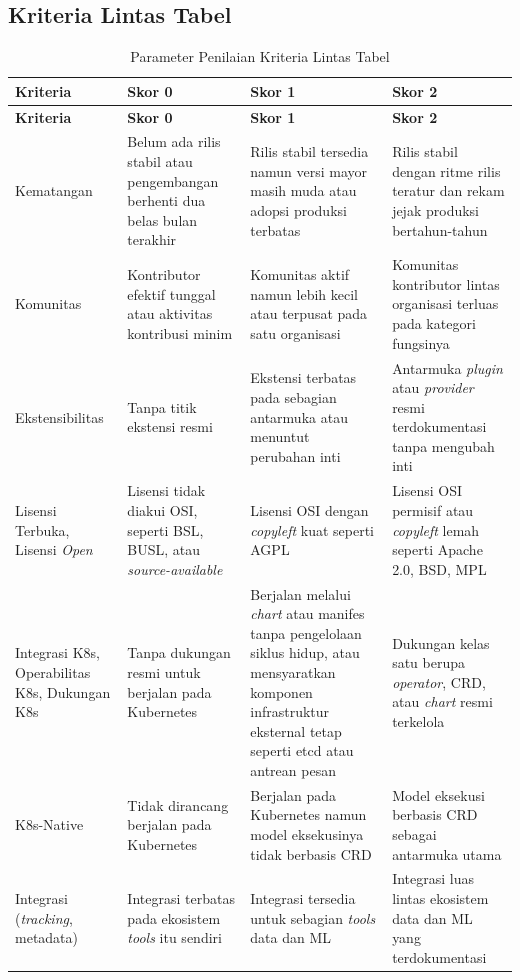 \subsection{Kriteria Lintas Tabel}
\label{sec:appx-rubrik-lintas}

{
\footnotesize
\setlength{\tabcolsep}{3pt}
\renewcommand{\arraystretch}{1.2}
\setlength{\LTpost}{0pt}
\begin{longtable}{|>{\raggedright\arraybackslash}m{2.6cm}|>{\raggedright\arraybackslash}m{3.4cm}|>{\raggedright\arraybackslash}m{3.5cm}|>{\raggedright\arraybackslash}m{3.5cm}|}
\caption{Parameter Penilaian Kriteria Lintas Tabel}
\label{tab:rubrik_lintas} \\
\hline
\textbf{Kriteria} & \textbf{Skor 0} & \textbf{Skor 1} & \textbf{Skor 2} \\
\hline
\endfirsthead
\hline
\textbf{Kriteria} & \textbf{Skor 0} & \textbf{Skor 1} & \textbf{Skor 2} \\
\hline
\endhead
\endfoot
\hline
\endlastfoot

Kematangan & Belum ada rilis stabil atau pengembangan berhenti dua belas bulan terakhir & Rilis stabil tersedia namun versi mayor masih muda atau adopsi produksi terbatas & Rilis stabil dengan ritme rilis teratur dan rekam jejak produksi bertahun-tahun \\
\hline
Komunitas & Kontributor efektif tunggal atau aktivitas kontribusi minim & Komunitas aktif namun lebih kecil atau terpusat pada satu organisasi & Komunitas kontributor lintas organisasi terluas pada kategori fungsinya \\
\hline
Ekstensibilitas & Tanpa titik ekstensi resmi & Ekstensi terbatas pada sebagian antarmuka atau menuntut perubahan inti & Antarmuka \textit{plugin} atau \textit{provider} resmi terdokumentasi tanpa mengubah inti \\
\hline
Lisensi Terbuka, Lisensi \textit{Open} & Lisensi tidak diakui OSI, seperti BSL, BUSL, atau \textit{source-available} & Lisensi OSI dengan \textit{copyleft} kuat seperti AGPL & Lisensi OSI permisif atau \textit{copyleft} lemah seperti Apache 2.0, BSD, MPL \\
\hline
Integrasi K8s, Opera\-bilitas K8s, Duku\-ngan K8s & Tanpa dukungan resmi untuk berjalan pada Kubernetes & Berjalan melalui \textit{chart} atau manifes tanpa pengelolaan siklus hidup, atau mensyaratkan komponen infrastruktur eksternal tetap seperti etcd atau antrean pesan & Dukungan kelas satu berupa \textit{operator}, CRD, atau \textit{chart} resmi terkelola \\
\hline
K8s-Native & Tidak dirancang berjalan pada Kubernetes & Berjalan pada Kubernetes namun model eksekusinya tidak berbasis CRD & Model eksekusi berbasis CRD sebagai antarmuka utama \\
\hline
Integrasi (\textit{tracking}, metadata) & Integrasi terbatas pada ekosistem \textit{tools} itu sendiri & Integrasi tersedia untuk sebagian \textit{tools} data dan ML & Integrasi luas lintas ekosistem data dan ML yang terdokumentasi \\
\hline
\end{longtable}
}

